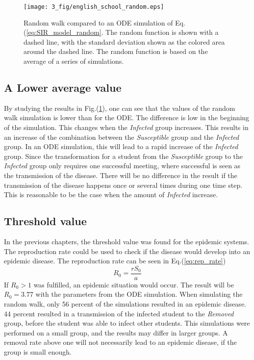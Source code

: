 \documentclass[%
twoside,                 %
final,                   %
chapterprefix=true,      %
open=right               %
10pt]{book}
\begin{document}
\begin{figure}[ht]
  \centerline{\texttt{[image: 3\_fig/english\_school\_random.eps]}}
  \caption{
  \label{fig:english_school_random}Random walk compared to an ODE simulation of Eq.(\ref{eq:SIR_model_random}. The random function is shown with a dashed line, with the standard deviation shown as the colored area around the dashed line. The random function is based on the average of a series of simulations.
  }
\end{figure}



\subsection{A Lower average value}
By studying the results in Fig.(\ref{fig:english_school_random}), one can see that the values of the random walk simulation is lower than for the ODE. The difference is low in the beginning of the simulation. This changes when the \emph{Infected} group increases. This results in an increase of the combination between the \emph{Susceptible} group and the \emph{Infected} group. In an ODE simulation, this will lead to a rapid increase of the \emph{Infected} group. Since the transformation for a student from the \emph{Susceptible} group to the \emph{Infected} group only requires one successful meeting, where successful is seen as the transmission of the disease. There will be no difference in the result if the transmission of the disease happens once or several times during one time step. This is reasonable to be the case when the amount of \emph{Infected} increase.  

\subsection{Threshold value}
In the previous chapters, the threshold value was found for the epidemic systems. The reproduction rate could be used to check if the disease would develop into an epidemic disease. The reproduction rate can be seen in Eq.(\ref{eq:rep_rate})
\begin{equation} \label{eq:rep_rate}
R_0 = \frac{rS_0}{a}
\end{equation}
If $R_0> 1$ was fulfilled, an epidemic situation would occur. The result will be $R_0 = 3.77$ with the parameters from the ODE simulation. When simulating the random walk, only 56 percent of the simulations resulted in an epidemic disease. 44 percent resulted in a transmission of the infected student to the \emph{Removed} group, before the student was able to infect other students. This simulations were performed on a small group, and the results may differ in larger groups. A removal rate above one will not necessarily lead to an epidemic disease, if the group is small enough.
\end{document}
